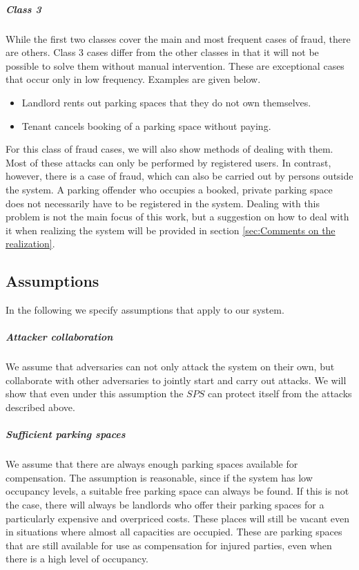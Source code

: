 \subparagraph{Class 3} While the first two classes cover the main and most frequent cases of fraud, there are others. Class 3 cases differ from the other classes in that it will not be possible to solve them without manual intervention. These are exceptional cases that occur only in low frequency. Examples are given below.
\begin{itemize}
\item Landlord rents out parking spaces that they do not own themselves.
\item Tenant cancels booking of a parking space without paying.
\end{itemize}
For this class of fraud cases, we will also show methods of dealing with them.\\

Most of these attacks can only be performed by registered users. In contrast, however, there is a case of fraud, which can also be carried out by persons outside the system. A parking offender who occupies a booked, private parking space does not necessarily have to be registered in the system. Dealing with this problem is not the main focus of this work, but a suggestion on how to deal with it when realizing the system will be provided in section \ref{sec:Comments on the realization}.

\subsection{Assumptions}\label{sec:Assumptions}
In the following we specify assumptions that apply to our system.\\

\subparagraph{Attacker collaboration} We assume that adversaries can not only attack the system on their own, but collaborate with other adversaries to jointly start and carry out attacks. We will show that even under this assumption the $SPS$ can protect itself from  the attacks described above.

\subparagraph{Sufficient parking spaces} We assume that there are always enough parking spaces available for compensation. The assumption is reasonable, since if the system has low occupancy levels, a suitable free parking space can always be found. If this is not the case, there will always be landlords  who offer their parking spaces for a particularly expensive and overpriced costs. These places will still be vacant even in situations where almost all capacities are occupied. These are parking spaces that are still available for use as compensation for injured parties, even when there is a high level of occupancy. 

